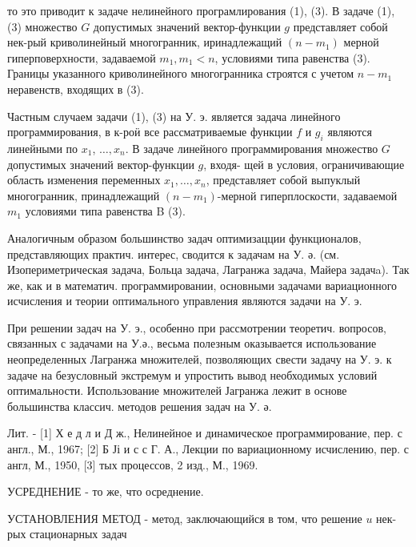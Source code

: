 \documentclass[10pt]{article}
\begin{document}
то это приводит к задаче нелинейного програмлирования (1), (3). В задаче (1), (3) множество $G$ допустимых значений вектор-функции $g$ представляет собой нек-рый криволинейный многогранник, иринадлежащий $\left(n-m_{1}\right)$ мерной гиперповерхности, задаваемой $m_{1}, m_{1}<n$, условиями типа равенства (3). Границы указанного криволинейного многогранника строятся с учетом $n-m_{1}$ неравенств, входящих в (3).



Частным случаем задачи (1), (3) на У. э. является задача линейного программирования, в к-роӥ все рассматриваемые функции $f$ и $g_{i}$ являются линейными по $x_{1}$, $\ldots, x_{n}$. В задаче линейного программирования множество $G$ допустимых значений вектор-функции $g$, входя- щей в условия, ограничивающие область изменения переменных $x_{1}, \ldots, x_{n}$, представляет собой выпуклый многогранник, принадлежащий $\left(n-m_{1}\right)$-мерной гиперплоскости, задаваемой $m_{1}$ условиями типа равенства B (3).



Аналогичным образом большинство задач оптимизацции функционалов, представляющих практич. интерес, сводится к задачам на У. ә. (см. Изопериметрическая задача, Больца задача, Лагранжа задача, Майера задачa). Так же, как и в математич. программировании, основными задачами вариационного исчисления и теории оптимального управления являются задачи на У. э.



При решении задач на У. э., особенно при рассмотрении теоретич. вопросов, связанных с задачами на У.ә., весьма полезным оказывается использование неопределенных Лагранжа множителей, позволяющих свести задачу на У. э. к задаче на безусловный экстремум и упростить вывод необходимых условий оптимальности. Использование множителей Јагранжа лежит в основе большинства классич. методов решения задач на У. ә.



Лит. - [1] Х е д л и Д ж., Нелинейное и динамическое программирование, пер. с англ., М., 1967; [2] Б Јі и с с Г. А., Лекции по вариационному исчислению, пер. с англ, М., 1950, [3] тых процессов, 2 изд., М., 1969.



УСРЕДНЕНИЕ - то же, что осреднение.



УСТАНОВЛЕНИЯ МЕТОД - метод, заключающийся в том, что решение $u$ нек-рых стационарных задач
\end{document}
